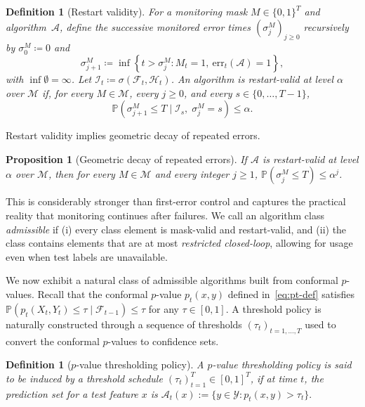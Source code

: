 \documentclass{uai2026} %
\newtheorem{proposition}[theorem]{Proposition}
\newtheorem{definition}[theorem]{Definition}
\newcommand{\1}{\mathbf{1}}
\newcommand{\prob}{\mathbb{P}}
\newcommand{\ycal}{\mathcal{Y}}
\newcommand{\err}{\mathrm{err}}
\newcommand{\F}{\mathcal{F}}
\newcommand{\mcal}{\mathcal{M}}
\newcommand{\acal}{\mathcal{A}}
\begin{document}
\begin{definition}[Restart validity]
  \label{def:restart-valid}
  For a monitoring mask $M\in\{0,1\}^{T}$ and algorithm~$\acal$, define the successive monitored error times $(\sigma_{j}^{M})_{j\geq0}$  recursively by $\sigma_0^{M}\coloneqq 0$ and
  \begin{equation*}
    \sigma_{j+1}^{M}
    \coloneqq
    \inf\left\{t > \sigma_{j}^{M} \colon M_t=1,\ \err_t(\acal)=1 \right\},
  \end{equation*}
  with $\inf\emptyset=\infty$.
  Let $\mathcal{I}_t\coloneqq \sigma(\F_t,\mathcal{H}_t)$.
  An algorithm is \emph{restart-valid at level $\alpha$} over $\mcal$ if, for every $M \in\mcal$, every $j\ge 0$, and every $s\in\{0,\dots,T-1\}$,
  \begin{equation*}
    \prob(\sigma_{j+1}^{M}\le T \mid \mathcal{I}_s,\; \sigma_j^{M}=s)
    \le \alpha.
  \end{equation*}
\end{definition}

Restart validity implies geometric decay of repeated errors.

\begin{proposition}[Geometric decay of repeated errors]
  \label{prop:geom-decay}
  If $\acal$ is restart-valid at level $\alpha$ over $\mcal$, then for every $M\in\mcal$ and every integer $j\ge 1$, $\prob(\sigma_j^{M}\le T)\le \alpha^j$.
\end{proposition}

This is considerably stronger than first-error control and captures the practical reality that monitoring continues after failures.
We call an algorithm class \emph{admissible} if (i) every class element is mask-valid and restart-valid, and (ii) the class contains elements that are at most \textit{restricted closed-loop}, allowing for usage even when test labels are unavailable.

We now exhibit a natural class of admissible algorithms built from conformal $p$-values.
Recall that the conformal $p$-value $p_t(x,y)$ defined in~\eqref{eq:pt-def} satisfies $\prob(p_t(X_t, Y_t) \le \tau \mid \F_{t-1}) \le \tau$ for any $\tau \in [0,1]$.
A threshold policy is naturally constructed through a sequence of thresholds $(\tau_t)_{t=1,\ldots, T}$ used to convert the conformal $p$-values to confidence sets.

\begin{definition}[$p$-value thresholding policy]
  \label{def:pval-threshold-policy}
A \emph{$p$-value thresholding policy} is said to be induced by a \emph{threshold schedule} $(\tau_t)_{t=1}^{T}\in [0,1]^T$, if at time $t$, the prediction set for a test feature $x$ is $\acal_t(x) := \{y \in \ycal : p_t(x, y) > \tau_t\}.$
\end{definition}
\end{document}
